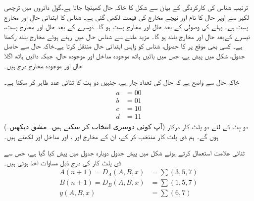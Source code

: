 \quad
ترتیب شناس کی کارکردگی کے بیان سے شکل  کا خاکہ حال کھینچا جاتا ہے۔گول دائروں میں ترچھی لکیر سے اوپر حال کا نام اور نیچے مخارج کی قیمت لکھی گئی ہے۔ شناس کا ابتدائی حال  اور مخارج پست  ہے۔ پہلے  کی وصولی کے بعد حال  اور مخارج پست ہو گا۔ دوسرے  کے بعد حال  اور مخارج پست، تیسرے  کےبعد حال  اور مخارج بلند ہو گا۔ مزید  ملنے سے شناس حال  میں رہتے ہوئے مخارج بلند رکھتا ہے۔ کسی بھی موقع پر  کا حصول، شناس کو واپس ابتدائی حال  منتقل کرتا ہے۔خاکہ حال سے حاصل جدول، شکل  میں پیش ہے، جس میں بائیں ہاتھ موجودہ مداخل اور موجودہ حال، جبکہ دائیں ہاتھ اگلا حال اور موجودہ مخارج درج ہیں۔

خاکہ حال سے واضح ہے کہ حال کی تعداد چار ہے، جنہیں دو بِٹ کا ثنائی عدد ظاہر کر سکتا ہے۔
\begin{gather}
\begin{aligned}\label{مساوات_ترتیبی_شناس_حال_انتخاب}
a&=00\\
b&=01\\
c&=10\\
d&=11
\end{aligned}
\end{gather}
(آپ کوئی دوسری انتخاب کر سکتے ہیں۔ مشق  دیکھیں۔) دو بِٹ کے لئے دو پلٹ کار درکار ہوں گے۔ ہم ڈی پلٹ کار منتخب کر کے، ان کے مخارج  اور ، اور مداخل  اور  لکھتے ہیں۔

ثنائی علامت استعمال کرتے ہوئے شکل  میں پیش جدول دوبارہ جدول  میں پیش کیا گیا ہے، جس سے ڈی پلٹ کار کی درج ذیل مساوات اخذ ہوتی ہیں۔
\begin{align*}
A(n+1)=D_A(A,B,x)&=\sum(3,5,7)\\
B(n+1)=D_B(A,B,x)&=\sum(1,5,7)\\
y(A,B,x)&=\sum(6,7)
\end{align*}

